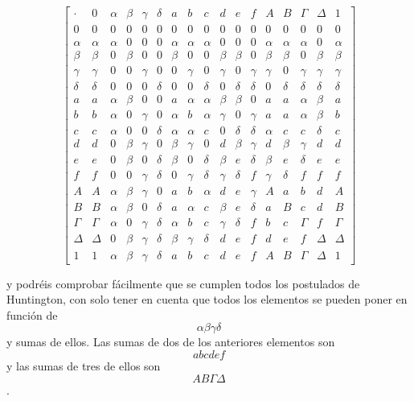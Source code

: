 \[\begin{bmatrix}
 \cdot & 0 & \alpha & \beta & \gamma & \delta & a & b & c & d & e & f & A & B & \Gamma & \Delta & 1 \\
0 & 0 & 0 & 0 & 0 & 0 & 0 & 0 & 0 & 0 & 0 & 0 & 0 & 0 & 0 & 0 & 0 \\
\alpha & \alpha & \alpha & 0 & 0 & 0 & \alpha & \alpha & \alpha & 0 & 0 & 0 & \alpha & \alpha & \alpha & 0 & \alpha \\
\beta & \beta & 0 & \beta & 0 & 0 & \beta & 0 & 0 & \beta & \beta & 0 & \beta & \beta & 0 & \beta & \beta \\
\gamma & \gamma & 0 & 0 & \gamma & 0 & 0 & \gamma & 0 & \gamma & 0 & \gamma & \gamma & 0 & \gamma & \gamma & \gamma \\
\delta & \delta & 0 & 0 & 0 & \delta & 0 & 0 & \delta & 0 & \delta & \delta & 0 & \delta & \delta & \delta & \delta \\
a & a & \alpha & \beta & 0 & 0 & a & \alpha & \alpha & \beta & \beta & 0 & a & a & \alpha & \beta & a \\
b & b & \alpha & 0 & \gamma & 0 & \alpha & b & \alpha & \gamma & 0 & \gamma & a & a & \alpha & \beta & b \\
c & c & \alpha & 0 & 0 & \delta & \alpha & \alpha & c & 0 & \delta & \delta & \alpha & c & c & \delta & c \\
d & d & 0 & \beta & \gamma & 0 & \beta & \gamma & 0 & d & \beta & \gamma & d & \beta & \gamma & d & d \\
e & e & 0 & \beta & 0 & \delta & \beta & 0 & \delta & \beta & e & \delta & \beta & e & \delta & e & e \\
f & f & 0 & 0 & \gamma & \delta & 0 & \gamma & \delta & \gamma & \delta & f & \gamma & \delta & f & f & f \\
A & A & \alpha & \beta & \gamma & 0 & a & b & \alpha & d & e & \gamma & A & a & b & d & A \\
B & B & \alpha & \beta & 0 & \delta & a & \alpha & c & \beta & e & \delta & a & B & c & d & B \\
\Gamma & \Gamma & \alpha & 0 & \gamma & \delta & \alpha & b & c & \gamma & \delta & f & b & c & \Gamma & f & \Gamma \\
\Delta & \Delta & 0 & \beta & \gamma & \delta & \beta & \gamma & \delta & d & e & f & d & e & f & \Delta & \Delta \\
1 & 1 & \alpha & \beta & \gamma & \delta & a & b & c & d & e & f & A & B & \Gamma & \Delta & 1
\end{bmatrix}\]

  y podréis comprobar fácilmente que se cumplen todos los postulados de
  Huntington, con solo tener en cuenta que todos los elementos se pueden
  poner en función de \[\alpha\beta\gamma\delta\]y sumas de ellos. Las
  sumas de dos de los anteriores elementos son \[abcdef\]y las sumas de
  tres de ellos son \[AB\Gamma\Delta\].

